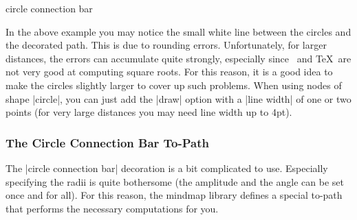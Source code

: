 \begin{decoration}{circle connection bar}
\begin{codeexample}[]
\end{codeexample}

  In the above example you may notice the small white line between the
  circles and the decorated path. This is due to rounding
  errors. Unfortunately, for larger distances, the errors can
  accumulate quite strongly, especially since \tikzname\ and \TeX\ are
  not very good at computing square roots. For this reason, it is a
  good idea to make the circles slightly larger to cover up such
  problems. When using nodes of shape |circle|, you can just add the
  |draw| option with a |line width| of one or two points (for very
  large distances you may need line width up to 4pt).
\begin{codeexample}[]
\end{codeexample}

\end{decoration}



\subsubsection{The Circle Connection Bar To-Path}

The |circle connection bar| decoration is a bit complicated to
use. Especially specifying the radii is quite bothersome (the
amplitude and the angle can be set once and for all). For this reason,
the mindmap library defines a special to-path that performs the
necessary computations for you.

